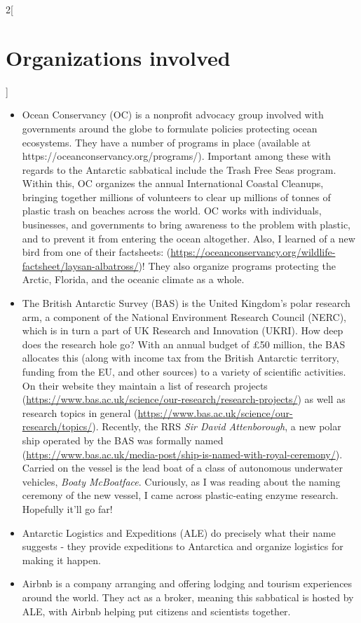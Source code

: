 \documentclass{article}
\begin{document}
\begin{multicols}{2}[\section{Organizations involved}]
\begin{itemize}
    \item Ocean Conservancy (OC) is a nonprofit advocacy group involved with governments around the globe to formulate policies protecting ocean ecosystems. They have a number of programs in place (available at https://oceanconservancy.org/programs/). Important among these with regards to the Antarctic sabbatical include the Trash Free Seas program. Within this, OC organizes the annual International Coastal Cleanups, bringing together millions of volunteers to clear up millions of tonnes of plastic trash on beaches across the world. OC works with individuals, businesses, and governments to bring awareness to the problem with plastic, and to prevent it from entering the ocean altogether. Also, I learned of a new bird from one of their factsheets: (\url{https://oceanconservancy.org/wildlife-factsheet/laysan-albatross/})! They also organize programs protecting the Arctic, Florida, and the oceanic climate as a whole.
    
    \item The British Antarctic Survey (BAS) is the United Kingdom's polar research arm, a component of the National Environment Research Council (NERC), which is in turn a part of UK Research and Innovation (UKRI). How deep does the research hole go? With an annual budget of £50 million, the BAS allocates this (along with income tax from the British Antarctic territory, funding from the EU, and other sources) to a variety of scientific activities. On their website they maintain a list of research projects (\url{https://www.bas.ac.uk/science/our-research/research-projects/}) as well as research topics in general (\url{https://www.bas.ac.uk/science/our-research/topics/}). Recently, the RRS \textit{Sir David Attenborough}, a new polar ship operated by the BAS was formally named (\url{https://www.bas.ac.uk/media-post/ship-is-named-with-royal-ceremony/}). Carried on the vessel is the lead boat of a class of autonomous underwater vehicles, \textit{Boaty McBoatface}. Curiously, as I was reading about the naming ceremony of the new vessel, I came across plastic-eating enzyme research. Hopefully it'll go far!
    
    \item Antarctic Logistics and Expeditions (ALE) do precisely what their name suggests - they provide expeditions to Antarctica and organize logistics for making it happen.
    
    \item Airbnb is a company arranging and offering lodging and tourism experiences around the world. They act as a broker, meaning this sabbatical is hosted by ALE, with Airbnb helping put citizens and scientists together.

\end{itemize}
\end{multicols}
\end{document}
